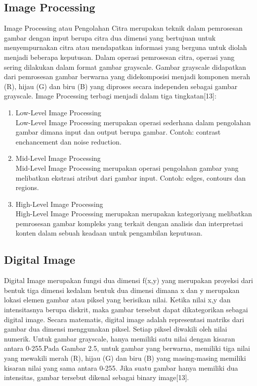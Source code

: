 \subsection{Image Processing}
Image Processing atau Pengolahan Citra merupakan teknik dalam pemrosesan gambar dengan input berupa 
citra dua dimensi yang bertujuan untuk menyempurnakan citra atau mendapatkan informasi yang berguna 
untuk diolah menjadi beberapa keputusan. Dalam operasi pemrosesan citra, operasi yang sering dilakukan 
dalam format gambar grayscale. Gambar grayscale didapatkan dari pemrosesan gambar berwarna yang 
didekomposisi menjadi komponen merah (R), hijau (G) dan biru (B) yang diproses secara independen sebagai 
gambar grayscale. Image Processing terbagi menjadi dalam tiga tingkatan[13]:
    \begin{enumerate}
        \item Low-Level Image Processing \\
        Low-Level Image Processing merupakan operasi sederhana dalam pengolahan gambar dimana input dan 
        output berupa gambar. Contoh: contrast enchancement dan noise reduction.
        \item Mid-Level Image Processing \\
        Mid-Level Image Processing merupakan operasi pengolahan gambar yang melibatkan ekstrasi atribut dari 
        gambar input. Contoh: edges, contours dan regions.
        \item High-Level Image Processing \\
        High-Level Image Processing merupakan merupakan kategoriyang melibatkan pemrosesan gambar kompleks 
        yang terkait dengan analisis dan interpretasi konten dalam sebuah keadaan untuk pengambilan keputusan.
    \end{enumerate}

\subsection{Digital Image}
Digital Image merupakan fungsi dua dimensi f(x,y) yang merupakan proyeksi dari bentuk tiga dimensi kedalam 
bentuk dua dimensi dimana x dan y merupakan lokasi elemen gambar atau piksel yang berisikan nilai. Ketika
nilai x,y dan intensitasnya berupa diskrit, maka gambar tersebut dapat dikategorikan sebagai digital
image. Secara matematis, digital image adalah representasi matriks dari gambar dua dimensi menggunakan
piksel. Setiap piksel  diwakili  oleh  nilai  numerik. Untuk  gambar  grayscale,  hanya  memiliki  
satu  nilai dengan kisaran antara 0-255.Pada Gambar 2.5, untuk gambar yang berwarna, memiliki tiga 
nilai yang mewakili merah (R), hijau (G) dan biru (B) yang masing-masing memiliki kisaran nilai yang 
sama antara 0-255. Jika suatu gambar hanya memiliki dua intensitas, gambar tersebut dikenal sebagai 
binary image[13].
